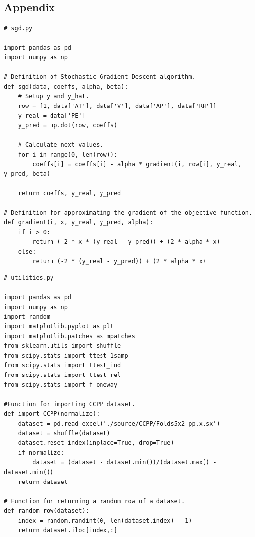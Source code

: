 \documentclass[letterpaper]{article} %
\begin{document}
\nocite{large_scale}
\nocite{overview_optimization}
\nocite{intro_sgd}




\onecolumn

\pagebreak

\begin{center}
\section*{Appendix}
\label{app:b}
\end{center}

\bigskip

\footnotesize{
\begin{verbatim}
# sgd.py

import pandas as pd
import numpy as np

# Definition of Stochastic Gradient Descent algorithm.
def sgd(data, coeffs, alpha, beta):
    # Setup y and y_hat.
    row = [1, data['AT'], data['V'], data['AP'], data['RH']]
    y_real = data['PE']
    y_pred = np.dot(row, coeffs)

    # Calculate next values.
    for i in range(0, len(row)):
        coeffs[i] = coeffs[i] - alpha * gradient(i, row[i], y_real, y_pred, beta)

    return coeffs, y_real, y_pred

# Definition for approximating the gradient of the objective function.
def gradient(i, x, y_real, y_pred, alpha):
    if i > 0:
        return (-2 * x * (y_real - y_pred)) + (2 * alpha * x)
    else:
        return (-2 * (y_real - y_pred)) + (2 * alpha * x)
\end{verbatim}
\bigskip
\begin{verbatim}
# utilities.py

import pandas as pd
import numpy as np
import random
import matplotlib.pyplot as plt
import matplotlib.patches as mpatches
from sklearn.utils import shuffle
from scipy.stats import ttest_1samp
from scipy.stats import ttest_ind
from scipy.stats import ttest_rel
from scipy.stats import f_oneway

#Function for importing CCPP dataset.
def import_CCPP(normalize):
    dataset = pd.read_excel('./source/CCPP/Folds5x2_pp.xlsx')
    dataset = shuffle(dataset)
    dataset.reset_index(inplace=True, drop=True)
    if normalize:
        dataset = (dataset - dataset.min())/(dataset.max() - dataset.min())
    return dataset

# Function for returning a random row of a dataset.
def random_row(dataset):
    index = random.randint(0, len(dataset.index) - 1)
    return dataset.iloc[index,:]


\end{verbatim}}
\end{document}
